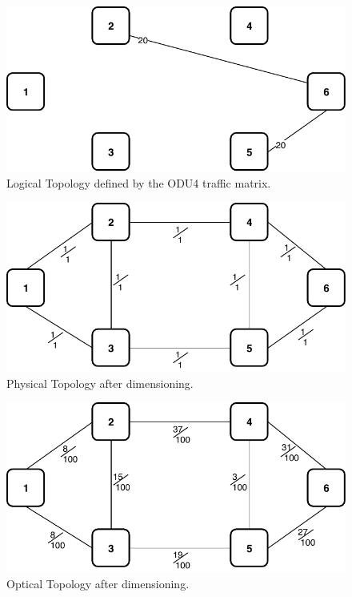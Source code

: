 \begin{figure}[h!]
\centering
\includegraphics[width=12cm]{sdf/ilp/opaque_survivability/figures/logical_topology_ODU4_high}
\caption{Logical Topology defined by the ODU4 traffic matrix.}
\label{logical_ODU4_high}
\end{figure}

\begin{figure}[h!]
\centering
\includegraphics[width=12cm]{sdf/ilp/opaque_survivability/figures/physical_topology}
\caption{Physical Topology after dimensioning.}
\label{physical_high}
\end{figure}

\begin{figure}[h!]
\centering
\includegraphics[width=12cm]{sdf/ilp/opaque_survivability/figures/optical_topology_high}
\caption{Optical Topology after dimensioning.}
\label{optical_high}
\end{figure}


